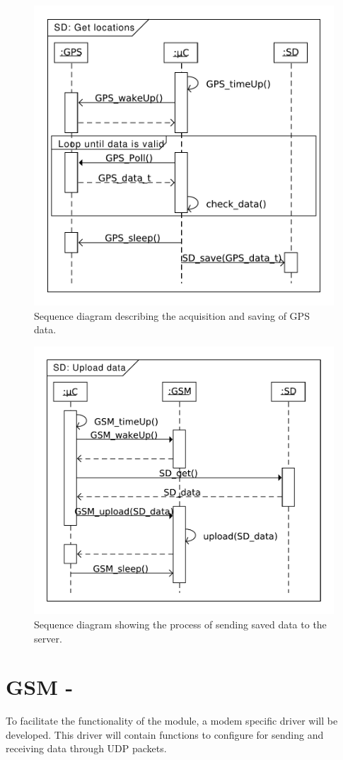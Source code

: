 \begin{figure}
	\centering
	\includegraphics[width=0.7\linewidth]{gfx/Design/SD_getLocation.pdf}
	\caption{Sequence diagram describing the acquisition and saving of GPS data.}
	\label{fig:SD:getlocation}
\end{figure}

\begin{figure}
	\centering
	\includegraphics[width=0.7\linewidth]{gfx/Design/SD_Upload.pdf}
	\caption{Sequence diagram showing the process of sending saved data to the server.}
	\label{fig:SD:upload}
\end{figure}

\FloatBarrier
{}
\section{GSM - \SARA}
To facilitate the functionality of the \SARA module, a modem specific driver will be developed. This driver will contain functions to configure \SARA for sending and receiving data through UDP packets.

